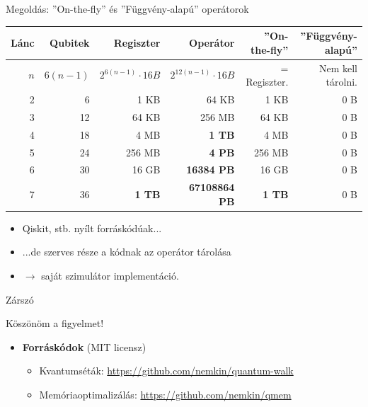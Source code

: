 \documentclass[aspectratio=169]{beamer}
\begin{document}
\begin{frame}[t]{Megoldás: ''On-the-fly'' és ''Függvény-alapú'' operátorok}
\vspace{2mm}
\begin{tabular}{r|r|r|r|r|r}
Lánc & Qubitek & Regiszter & Operátor &  \cellcolor{applegreen!30} ''On-the-fly'' &  \cellcolor{applegreen!30} ''Függvény-alapú'' \\
\hline
\rule{0pt}{1.05\normalbaselineskip} $n$ & $6(n-1)$ & $2^{6(n-1)} \cdot{} 16 B$ & ${2^{12(n-1)}} \cdot{} 16 B$ &  = Regiszter. &   Nem kell tárolni. \\
\hline
2 & 6 &  1 KB &  64 KB &  1 KB & 0 B \\
3 & 12 &  64 KB &  256 MB &  64 KB & 0 B \\
4 & 18 &  4 MB & \color{red} \textbf{1 TB} &  4 MB & 0 B  \\
5 & 24 &  256 MB & \color{red} \textbf{4 PB} &  256 MB & 0 B \\
6 & 30 &  16 GB & \color{red} \textbf{16384 PB} &  16 GB & 0 B\\
7 & 36 & \color{red} \textbf{1 TB} & \color{red} \textbf{67108864 PB} & \color{red} \textbf{1 TB} & 0 B
\end{tabular}
\pause
\vspace{2mm}
\begin{itemize}
    \item Qiskit, stb. nyílt forráskódúak...
    \item ...de szerves része a kódnak az operátor tárolása
    \item $\rightarrow$ saját szimulátor implementáció.
\end{itemize}

\end{frame}




\begin{frame}{Zárszó}

\begin{center}
\begin{LARGE}
Köszönöm a figyelmet!
\end{LARGE}
\end{center}

\begin{itemize}
\item \textbf{Forráskódok} (MIT licensz)
\begin{itemize}
\item Kvantumséták: \href{https://github.com/nemkin/quantum-walk}{\color{blue}https://github.com/nemkin/quantum-walk}
\item Memóriaoptimalizálás: \href{https://github.com/nemkin/qmem}{\color{blue}https://github.com/nemkin/qmem}
\end{itemize}
\end{itemize}
\end{frame}
\end{document}
